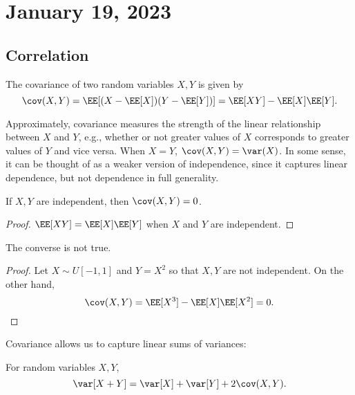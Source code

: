 \section{January 19, 2023}

\subsection{Correlation}

\begin{definition}

The covariance of two random variables $X,Y$ is given by
\[\cov(X,Y) = \EE[(X-\EE[X])(Y-\EE[Y])] = \EE[XY] - \EE[X]\EE[Y].\]
\end{definition}

Approximately, covariance measures the strength of the linear relationship between $X$ and $Y$, e.g., whether or not greater values of $X$ corresponds to greater values of $Y$ and vice versa. When $X=Y$, $\cov(X,Y) = \var(X)$. In some sense, it can be thought of as a weaker version of independence, since it captures linear dependence, but not dependence in full generality.

\begin{theorem}
\lemlabel

If $X,Y$ are independent, then $\cov(X,Y)=0$.
\end{theorem}

\begin{proof}
$\EE[XY] = \EE[X]\EE[Y]$ when $X$ and $Y$ are independent.
\end{proof}

\begin{theorem}
\lemlabel

The converse is not true.
\end{theorem}

\begin{proof}
Let $X\sim U[-1,1]$ and $Y=X^2$ so that $X,Y$ are not independent. On the other hand, 
\[\cov(X,Y) = \EE[X^3]-\EE[X]\EE[X^2] = 0.\]
\end{proof}

Covariance allows us to capture linear sums of variances:
\begin{theorem}
\lemlabel

For random variables $X,Y$, 
\[\var[X+Y] = \var[X] + \var[Y] + 2\cov(X,Y).\]
\end{theorem}

